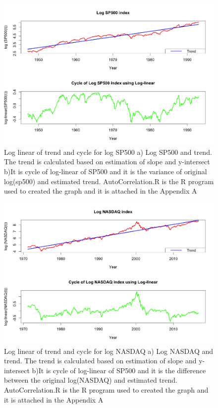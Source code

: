 \begin{figure}[!ht]
\centering
\includegraphics[scale=.5]{Images/lltcsp500}
\caption{Log linear of trend and cycle for log SP500 a) Log SP500 and trend. The trend is calculated based on estimation of slope and y-intersect  b)It is cycle of log-linear of SP500 and it is the variance of original log(sp500) and estimated trend. AutoCorrelation.R is the R program used to created the graph and it is attached in the Appendix A}
\label{fig:ACSP500}
\end{figure}

\begin{figure}[!ht]
\centering
\includegraphics[scale=.5]{Images/lltcnasdaq}
\caption{Log linear of trend and cycle for log NASDAQ a) Log NASDAQ and trend. The trend is calculated based on estimation of slope and y-intersect  b)It is cycle of log-linear of SP500 and it is the difference between the original log(NASDAQ) and estimated trend. AutoCorrelation.R is the R program used to created the graph and it is attached in the Appendix A}
\label{fig:ACNASDAQ}
\end{figure}


